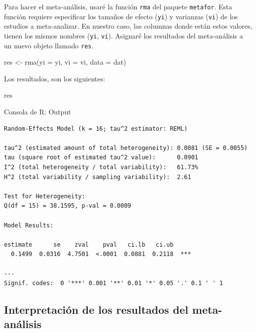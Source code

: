 \documentclass[
  bookmarksnumbered]{article}
\newenvironment{Shaded}{\begin{snugshade}}{\end{snugshade}}
\newcommand{\AttributeTok}[1]{\textcolor[rgb]{0.00,0.34,0.68}{#1}}
\newcommand{\FunctionTok}[1]{\textcolor[rgb]{0.39,0.29,0.61}{#1}}
\newcommand{\NormalTok}[1]{\textcolor[rgb]{0.12,0.11,0.11}{#1}}
\newcommand{\OtherTok}[1]{\textcolor[rgb]{0.00,0.43,0.16}{#1}}
\begin{document}
Para hacer el meta-análisis, usaré la función \texttt{rma} del paquete \texttt{metafor}. Esta función requiere especificar los tamaños de efecto (\texttt{yi}) y varianzas (\texttt{vi}) de los estudios a meta-analizar. En nuestro caso, las columnas donde están estos valores, tienen los mismos nombres (\texttt{yi}, \texttt{vi}). Asignaré los resultados del meta-análisis a un nuevo objeto llamado \texttt{res}.

\begin{Shaded}
\begin{Highlighting}[]
\NormalTok{res }\OtherTok{\textless{}{-}} \FunctionTok{rma}\NormalTok{(}\AttributeTok{yi =}\NormalTok{ yi, }\AttributeTok{vi =}\NormalTok{ vi, }\AttributeTok{data =}\NormalTok{ dat)}
\end{Highlighting}
\end{Shaded}

Los resultados, son los siguientes:

\begin{Shaded}
\begin{Highlighting}[]
\NormalTok{res}
\end{Highlighting}
\end{Shaded}

\begin{ROut}{Consola de R: Output~\thetcbcounter}
                \begin{footnotesize}
                \begin{verbatim} 
Random-Effects Model (k = 16; tau^2 estimator: REML)

tau^2 (estimated amount of total heterogeneity): 0.0081 (SE = 0.0055)
tau (square root of estimated tau^2 value):      0.0901
I^2 (total heterogeneity / total variability):   61.73%
H^2 (total variability / sampling variability):  2.61

Test for Heterogeneity:
Q(df = 15) = 38.1595, p-val = 0.0009

Model Results:

estimate      se    zval    pval   ci.lb   ci.ub      
  0.1499  0.0316  4.7501  <.0001  0.0881  0.2118  *** 

---
Signif. codes:  0 '***' 0.001 '**' 0.01 '*' 0.05 '.' 0.1 ' ' 1
 \end{verbatim}
                \end{footnotesize}
                \end{ROut}

\hypertarget{meta-interp}{%
\subsection{Interpretación de los resultados del meta-análisis}\label{meta-interp}}
\end{document}
